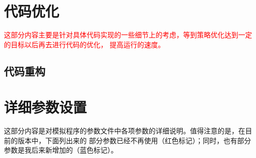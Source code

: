 \documentclass[a4paper,11pt]{ctexart}
\newcommand{\RT}[1]{\textcolor{red}{#1}}
\begin{document}
\newpage
\section{代码优化}
\RT{这部分内容主要是针对具体代码实现的一些细节上的考虑，等到策略优化达到一定的目标以后再去进行代码的优化，
提高运行的速度。}

\subsection{代码重构}

\newpage
\appendix
\section{详细参数设置}
这部分内容是对模拟程序的参数文件中各项参数的详细说明。值得注意的是，在目前的版本中，下面列出来的
部分参数已经不再使用（红色标记）；同时，也有部分参数是我后来新增加的（蓝色标记）。
\end{document}
